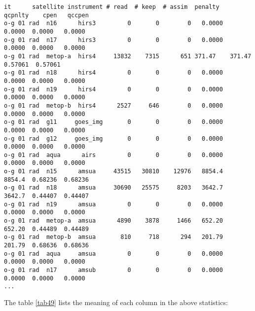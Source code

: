 \begin{itemize}[leftmargin=*]
\begin{scriptsize}
\begin{verbatim}
it      satellite instrument # read  # keep  # assim  penalty   qcpnlty    cpen   qccpen
o-g 01 rad  n16      hirs3         0       0        0   0.0000    0.0000  0.0000   0.0000
o-g 01 rad  n17      hirs3         0       0        0   0.0000    0.0000  0.0000   0.0000
o-g 01 rad  metop-a  hirs4     13832    7315      651 371.47    371.47    0.57061  0.57061
o-g 01 rad  n18      hirs4         0       0        0   0.0000    0.0000  0.0000   0.0000
o-g 01 rad  n19      hirs4         0       0        0   0.0000    0.0000  0.0000   0.0000
o-g 01 rad  metop-b  hirs4      2527     646        0   0.0000    0.0000  0.0000   0.0000
o-g 01 rad  g11     goes_img       0       0        0   0.0000    0.0000  0.0000   0.0000
o-g 01 rad  g12     goes_img       0       0        0   0.0000    0.0000  0.0000   0.0000
o-g 01 rad  aqua      airs         0       0        0   0.0000    0.0000  0.0000   0.0000
o-g 01 rad  n15      amsua     43515   30810    12976   8854.4    8854.4  0.68236  0.68236
o-g 01 rad  n18      amsua     30690   25575     8203   3642.7    3642.7  0.44407  0.44407
o-g 01 rad  n19      amsua         0       0        0   0.0000    0.0000  0.0000   0.0000
o-g 01 rad  metop-a  amsua      4890    3878     1466   652.20    652.20  0.44489  0.44489
o-g 01 rad  metop-b  amsua       810     718      294   201.79    201.79  0.68636  0.68636
o-g 01 rad  aqua     amsua         0       0        0   0.0000    0.0000  0.0000   0.0000
o-g 01 rad  n17      amsub         0       0        0   0.0000    0.0000  0.0000   0.0000
...
\end{verbatim}
\end{scriptsize}

The table \ref{tab49} lists the meaning of each column in the above statistics:


\end{itemize}
